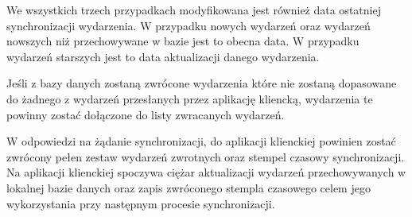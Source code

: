 We wszystkich trzech przypadkach modyfikowana jest również data ostatniej synchronizacji wydarzenia. W przypadku nowych wydarzeń oraz wydarzeń nowszych niż przechowywane w bazie jest to obecna data. W przypadku wydarzeń starszych jest to data aktualizacji danego wydarzenia.

Jeśli z bazy danych zostaną zwrócone wydarzenia które nie zostaną dopasowane do żadnego z wydarzeń przesłanych przez aplikację kliencką, wydarzenia te powinny zostać dołączone do listy zwracanych wydarzeń.

W odpowiedzi na żądanie synchronizacji, do aplikacji klienckiej powinien zostać zwrócony pełen zestaw wydarzeń zwrotnych oraz stempel czasowy synchronizacji. Na aplikacji klienckiej spoczywa ciężar aktualizacji wydarzeń przechowywanych w lokalnej bazie danych oraz zapis zwróconego stempla czasowego celem jego wykorzystania przy następnym procesie synchronizacji.